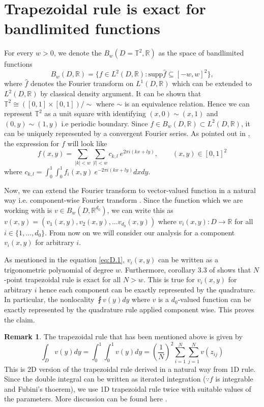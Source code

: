 \documentclass[reqno,10pt]{amsart}
\theoremstyle{plain}
\theoremstyle{definition}
\newtheorem{rem}{Remark}
\newcommand{\bb}[1]{\mathbb{#1}}
\begin{document}
    \section{\bf Trapezoidal rule is exact for bandlimited functions} \label{appendix:trapezoidal} %
    \noindent For every $w > 0$, we denote the $B_w(D=\bb T^2, \bb R)$ as the space of bandlimited functions
    $$ B_w(D,\bb R) = \{f \in L^2(D, \bb R) : \text{supp}\hat{f} \subseteq [-w,w]^2\},$$
    where $\hat{f}$ denotes the Fourier transform on $L^1(D, \bb R)$ which can be extended to $L^2(D, \bb R)$ by classical density argument. It can be shown that $\bb T^2 \cong ([0,1]\times[0,1])/\sim$ where $\sim$ is an equivalence relation. Hence we can represent $\bb T^2$ as a unit square with identifying $(x,0) \sim (x,1)$ and $(0,y) \sim (1,y)$ i.e periodic boundary. Since $f\in B_w(D,\bb R) \subset L^2(D,\bb R)$, it can be uniquely represented by a convergent Fourier series. As pointed out in \cite{RB2003}, the expression for $f$ will look like
    \begin{equation}\label{eq:D.1}
        f(x,y) = \sum_{|k|< w} \sum_{|l| < w} c_{k,l}~e^{2\pi i (kx+ly)}, \qquad (x,y) \in [0,1]^2 
    \end{equation}
    where $c_{k,l}= \int_{0}^{1}\int_{0}^{1} f_i(x,y)~e^{-2\pi i (kx+ly)} dx dy$.

    \noindent Now, we can extend the Fourier transform to vector-valued function in a natural way i.e. component-wise Fourier transform \cite{TN2012}. Since the function which we are working with is $v \in B_w(D,\bb R^{d_0})$, we can write this as $v(x,y) = (v_1(x,y),v_2(x,y), \dots v_{d_0}(x,y))$ where $v_i(x,y) : D \to \bb R$ for all $i \in \{1, \dots , d_0\}$. From now on we will consider our analysis for a component $v_i(x,y)$ for arbitrary $i$. 

    \noindent As mentioned in the equation \ref{eq:D.1}, $v_i(x,y)$ can be written as a trigonometric polynomial of degree $w$. Furthermore, corollary 3.3 of \cite{LT2014} shows that $N$-point trapezoidal rule is exact for all $N > w$. This is true for $v_i(x,y)$ for arbitrary $i$ hence each component can be exactly represented by the quadrature. In particular, the nonlocality $\fint v(y)dy$ where $v$ is a $d_0$-valued function can be exactly represented by the quadrature rule applied component wise. This proves the claim.
    \begin{rem}\label{rem:2D_quadrature}
        The trapezoidal rule that has been mentioned above is given by
        $$ \int_{D} v(y) dy = \int_{0}^{1} \int_{0}^{1} v(y) dy =  \left(\frac{1}{N}\right)^2 \sum_{i=1}^{N} \sum_{j=1}^{N} v(z_{ij})$$
    This is 2D version of the trapezoidal rule derived in a natural way from 1D rule. Since the double integral can be written as iterated integration ($\because f$ is integrable and Fubini's thoerem), we use 1D trapezoidal rule twice with suitable values of the parameters. More discussion can be found here \cite{kth2013}.
    \end{rem}



\end{document}
